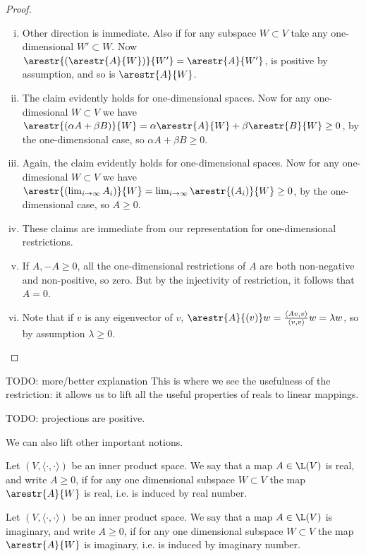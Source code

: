 \begin{proof}
	\begin{enumerate}[(i)]
		\item Other direction is immediate. Also if for any subspace $W \subset V$ take any one-dimensional $W' \subset W$. Now $\arestr{(\arestr{A}{W})}{W'} = \arestr{A}{W'}$, is positive by assumption, and so is $\arestr{A}{W}$.
		\item The claim evidently holds for one-dimensional spaces. Now for any one-dimesional $W \subset V$ we have $\arestr{(\alpha A + \beta B)}{W} = \alpha \arestr{A}{W} + \beta \arestr{B}{W} \geq 0$, by the one-dimensional case, so $\alpha A + \beta B \geq 0$.
		\item Again, the claim evidently holds for one-dimensional spaces. Now for any one-dimesional $W \subset V$ we have $\arestr{(\lim_{i \to \infty} A_{i})}{W} = \lim_{i \to \infty}\arestr{(A_{i})}{W}\geq 0$, by the one-dimensional case, so $A \geq 0$.
		\item These claims are immediate from our representation for one-dimensional restrictions.
		\item If $A, -A \geq 0$, all the one-dimensional restrictions of $A$ are both non-negative and non-positive, so zero. But by the injectivity of restriction, it follows that $A = 0$.
		\item Note that if $v$ is any eigenvector of $v$, $\arestr{A}{(v)} w = \frac{\langle A v, v\rangle}{\langle v, v\rangle} w = \lambda w$, so by assumption $\lambda \geq 0$.
	\end{enumerate}
\end{proof}

TODO: more/better explanation
This is where we see the usefulness of the restriction: it allows us to lift all the useful properties of reals to linear mappings.

TODO: projections are positive.

We can also lift other important notions.

\begin{maar}
	Let $(V, \langle \cdot, \cdot \rangle)$ be an inner product space. We say that a map $A \in \L(V)$ is real, and write $A \geq 0$, if for any one dimensional subspace $W \subset V$ the map $\arestr{A}{W}$ is real, i.e. is induced by real number.
\end{maar}

\begin{maar}
	Let $(V, \langle \cdot, \cdot \rangle)$ be an inner product space. We say that a map $A \in \L(V)$ is imaginary, and write $A \geq 0$, if for any one dimensional subspace $W \subset V$ the map $\arestr{A}{W}$ is imaginary, i.e. is induced by imaginary number.
\end{maar}

